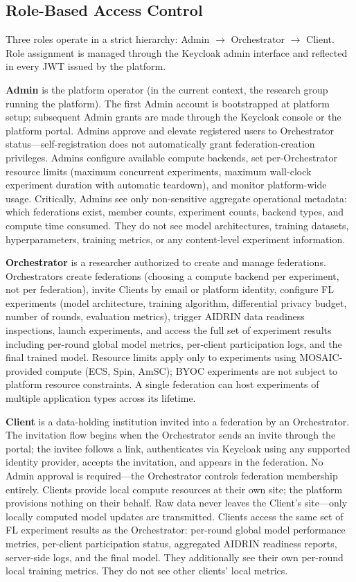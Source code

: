 \documentclass[conference]{IEEEtran}
\begin{document}
\subsection{Role-Based Access Control}

Three roles operate in a strict hierarchy: Admin $\to$ Orchestrator
$\to$ Client. Role assignment is managed through the Keycloak admin
interface and reflected in every JWT issued by the platform.

\textbf{Admin} is the platform operator (in the current context, the
research group running the platform). The first Admin account is
bootstrapped at platform setup; subsequent Admin grants are made
through the Keycloak console or the platform portal. Admins approve and
elevate registered users to Orchestrator status---self-registration
does not automatically grant federation-creation privileges. Admins
configure available compute backends, set per-Orchestrator resource
limits (maximum concurrent experiments, maximum wall-clock experiment
duration with automatic teardown), and monitor platform-wide usage.
Critically, Admins see only non-sensitive aggregate operational
metadata: which federations exist, member counts, experiment counts,
backend types, and compute time consumed. They do not see model
architectures, training datasets, hyperparameters, training metrics,
or any content-level experiment information.

\textbf{Orchestrator} is a researcher authorized to create and manage
federations. Orchestrators create federations (choosing a compute
backend per experiment, not per federation), invite Clients by email
or platform identity, configure FL experiments (model architecture,
training algorithm, differential privacy budget, number of rounds,
evaluation metrics), trigger AIDRIN data readiness inspections, launch
experiments, and access the full set of experiment results including
per-round global model metrics, per-client participation logs, and the
final trained model. Resource limits apply only to experiments using
MOSAIC-provided compute (ECS, Spin, AmSC); BYOC experiments are not
subject to platform resource constraints. A single federation can host
experiments of multiple application types across its lifetime.

\textbf{Client} is a data-holding institution invited into a
federation by an Orchestrator. The invitation flow begins when the
Orchestrator sends an invite through the portal; the invitee follows
a link, authenticates via Keycloak using any supported identity
provider, accepts the invitation, and appears in the federation. No
Admin approval is required---the Orchestrator controls federation
membership entirely. Clients provide local compute resources at their
own site; the platform provisions nothing on their behalf. Raw data
never leaves the Client's site---only locally computed model updates
are transmitted. Clients access the same set of FL experiment results
as the Orchestrator: per-round global model performance metrics,
per-client participation status, aggregated AIDRIN readiness reports,
server-side logs, and the final model. They additionally see their own
per-round local training metrics. They do not see other clients' local
metrics.
\end{document}
